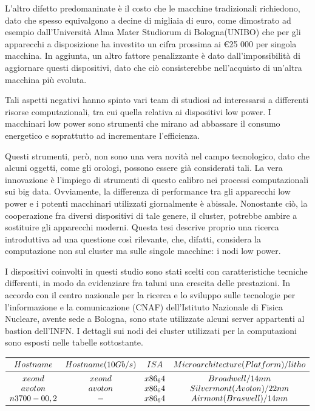 L'altro difetto predomaninate è il costo che le macchine tradizionali richiedono, dato che spesso equivalgono a decine di migliaia di euro, come dimostrato ad esempio dall'Università Alma Mater Studiorum di Bologna(UNIBO) che per gli apparecchi a disposizione ha investito un cifra prossima ai \euro 25 000 per singola macchina.
In aggiunta, un altro fattore penalizzante è dato dall'impossibilità di aggiornare questi dispositivi, dato che ciò consisterebbe nell'acquisto di un'altra macchina più evoluta.

Tali aspetti negativi hanno spinto vari team di studiosi ad interessarsi a differenti risorse computazionali, tra cui quella relativa ai dispositivi low power.
I macchinari low power sono strumenti che mirano ad abbassare il consumo energetico e soprattutto ad incrementare l'efficienza.

Questi strumenti, però, non sono una vera novità nel campo tecnologico, dato che alcuni oggetti, come gli orologi, possono essere già considerati tali.
La vera innovazione è l'impiego di strumenti di questo calibro nei processi computazionali sui big data.
Ovviamente, la differenza di performance tra gli apparecchi low power e i potenti macchinari utilizzati giornalmente è abissale.
Nonostante ciò, la cooperazione fra diversi dispositivi di tale genere, il cluster, potrebbe ambire a sostituire gli apparecchi moderni.
Questa tesi descrive proprio una ricerca introduttiva ad una questione così rilevante, che, difatti, considera la computazione non sul cluster ma sulle singole macchine: i nodi low power.

I dispositivi coinvolti in questi studio sono stati scelti con caratteristiche tecniche differenti, in modo da evidenziare fra taluni una crescita delle prestazioni.
In accordo con il centro nazionale per la ricerca e lo sviluppo sulle tecnologie per l'informazione e la comunicazione (CNAF) dell'Istituto Nazionale di Fisica Nucleare, avente sede a Bologna, sono state utilizzate alcuni server appartenti al bastion dell'INFN.
I dettagli sui nodi dei cluster utilizzati per la computazioni sono esposti nelle tabelle sottostante.
\begin{table}
\centering
$\begin{array}{*{4}{c}}
	\toprule
		Hostname & Hostname(10Gb/s) & ISA & Microarchitecture(Platform)/litho \\
	\midrule
		xeond & xeond & x86_64 & Broadwell/14nm \\
		avoton & avoton & x86_64 & Silvermont(Avoton)/22nm \\
		n3700-0{0,2} & - & x86_64 & Airmont(Braswell)/14nm \\
	\bottomrule
\end{array}$
\caption{}
\end{table}

